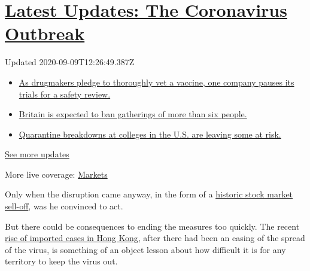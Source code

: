 \hypertarget{latest-updates-the-coronavirus-outbreak}{%
\section{\texorpdfstring{\href{https://www.nytimes3xbfgragh.onion/2020/09/09/world/covid-19-coronavirus.html?action=click\&pgtype=Article\&state=default\&region=MAIN_CONTENT_1\&context=storylines_live_updates}{Latest
Updates: The Coronavirus
Outbreak}}{Latest Updates: The Coronavirus Outbreak}}\label{latest-updates-the-coronavirus-outbreak}}

Updated 2020-09-09T12:26:49.387Z

\begin{itemize}
\tightlist
\item
  \href{https://www.nytimes3xbfgragh.onion/2020/09/09/world/covid-19-coronavirus.html?action=click\&pgtype=Article\&state=default\&region=MAIN_CONTENT_1\&context=storylines_live_updates\#link-70cea8bb}{As
  drugmakers pledge to thoroughly vet a vaccine, one company pauses its
  trials for a safety review.}
\item
  \href{https://www.nytimes3xbfgragh.onion/2020/09/09/world/covid-19-coronavirus.html?action=click\&pgtype=Article\&state=default\&region=MAIN_CONTENT_1\&context=storylines_live_updates\#link-780eaa2f}{Britain
  is expected to ban gatherings of more than six people.}
\item
  \href{https://www.nytimes3xbfgragh.onion/2020/09/09/world/covid-19-coronavirus.html?action=click\&pgtype=Article\&state=default\&region=MAIN_CONTENT_1\&context=storylines_live_updates\#link-11cec4c0}{Quarantine
  breakdowns at colleges in the U.S. are leaving some at risk.}
\end{itemize}

\href{https://www.nytimes3xbfgragh.onion/2020/09/09/world/covid-19-coronavirus.html?action=click\&pgtype=Article\&state=default\&region=MAIN_CONTENT_1\&context=storylines_live_updates}{See
more updates}

More live coverage:
\href{https://www.nytimes3xbfgragh.onion/live/2020/09/09/business/stock-market-today-coronavirus?action=click\&pgtype=Article\&state=default\&region=MAIN_CONTENT_1\&context=storylines_live_updates}{Markets}

Only when the disruption came anyway, in the form of a
\href{https://www.nytimes3xbfgragh.onion/2020/03/20/business/coronavirus-trump-stock-market.html}{historic
stock market sell-off}, was he convinced to act.

But there could be consequences to ending the measures too quickly. The
recent
\href{https://www.cnn.com/2020/03/23/asia/hong-kong-coronavirus-quarantine-intl-hnk/index.html}{rise
of imported cases in Hong Kong}, after there had been an easing of the
spread of the virus, is something of an object lesson about how
difficult it is for any territory to keep the virus out.

